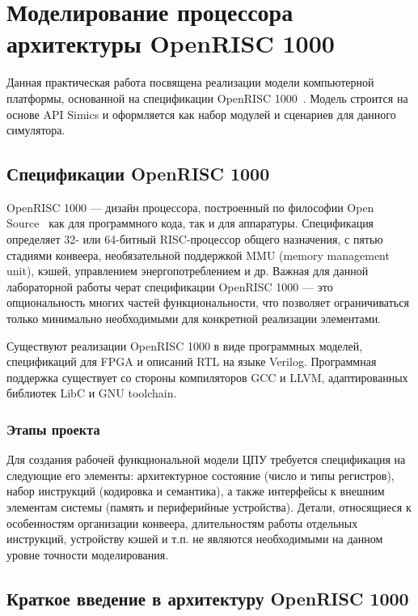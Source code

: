 \chapter{Моделирование процессора архитектуры OpenRISC 1000}\label{chap:lab06}

Данная практическая работа посвящена реализации модели компьютерной платформы, основанной на спецификации OpenRISC 1000~\cite{or1k-spec}. Модель строится на основе API Simics и оформляется как набор модулей и сценариев для данного симулятора.

\section{Спецификации OpenRISC 1000}

OpenRISC 1000 --- дизайн процессора, построенный по философии Open Source~\cite{open-source-definition-ru} как для программного кода, так и для аппаратуры. Спецификация определяет 32- или 64-битный RISC-процессор общего назначения, с пятью стадиями конвеера, необязательной поддержкой MMU (\abbr memory management unit), кэшей, управлением энергопотреблением и др. Важная для данной лабораторной работы черат спецификации OpenRISC 1000 --- это опциональность многих частей функциональности, что позволяет ограничиваться только минимально необходимыми для конкретной реализации элементами.

Существуют реализации OpenRISC 1000 в виде программных моделей, спецификаций для FPGA и описаний RTL на языке Verilog. Программная поддержка существует со стороны компиляторов GCC и LLVM, адаптированных библиотек LibC и GNU toolchain.

\subsection{Этапы проекта}

Для создания рабочей функциональной модели ЦПУ требуется спецификация на следующие его элементы: архитектурное состояние (число и типы регистров), набор инструкций (кодировка и семантика), а также интерфейсы к внешним элементам системы (память и периферийные устройства). Детали, относящиеся к особенностям организации конвеера, длительностям работы отдельных инструкций, устройству кэшей и т.п. не являются необходимыми на данном уровне точности моделирования.

\section{Краткое введение в архитектуру OpenRISC 1000}

